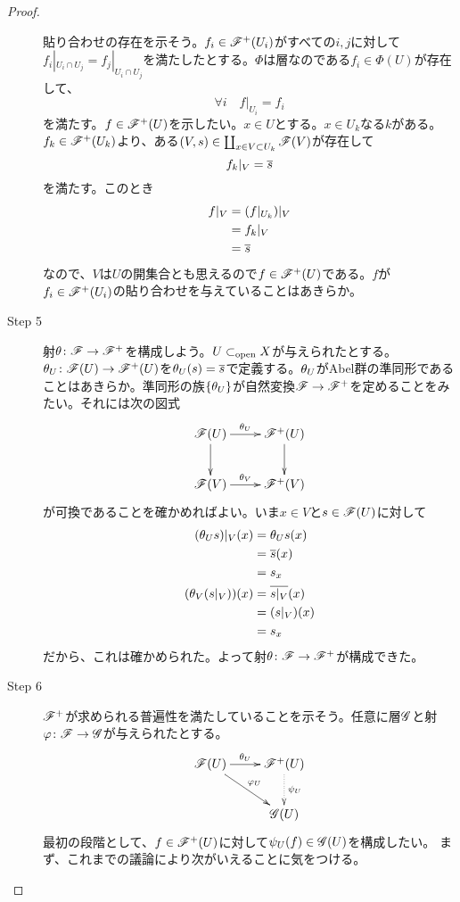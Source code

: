 \begin{proof}
\begin{description}
貼り合わせの存在を示そう。$f_i \in \mathscr{F}^+(U_i)$がすべての$i,j$に対して$f_i |_{U_i \cap U_j} = f_j |_{U_i \cap U_j}$を満たしたとする。$\Phi$は層なのである$f_i \in \Phi(U)$が存在して、
\[
\forall i \quad f|_{U_i} = f_i
\]
を満たす。$f \in \mathscr{F}^+(U)$を示したい。$x \in U$とする。$x \in U_k$なる$k$がある。$f_k \in \mathscr{F}^+(U_k)$より、ある$(V,s) \in \coprod_{x \in V \subset U_k} \mathscr{F}(V)$が存在して
\[
f_k |_V = \overline{s}
\]
を満たす。このとき
\begin{align*}
  f|_V &= (f|_{U_k})|_V \\
  &= f_k |_V \\
  &= \overline{s}
\end{align*}
なので、$V$は$U$の開集合とも思えるので$f \in \mathscr{F}^+(U)$である。$f$が$f_i \in \mathscr{F}^+(U_i)$の貼り合わせを与えていることはあきらか。

\item[Step 5] 射${\theta} \colon \mathscr{F} \to \mathscr{F}^+$を構成しよう。$U \subset_{\text{open}} X$が与えられたとする。${\theta}_U \colon \mathscr{F}(U) \to \mathscr{F}^+(U) $を${\theta}_U (s) = \overline{s}$で定義する。${\theta}_U$がAbel群の準同形であることはあきらか。準同形の族$\{ {\theta}_U \}$が自然変換$\mathscr{F} \to \mathscr{F}^+$を定めることをみたい。それには次の図式
\[
\xymatrix{
\scrf(U) \ar[r]^-{\grt_U} \ar[d] & \scrf^+(U) \ar[d] \\
\scrf(V) \ar[r]^-{\grt_V} & \scrf^+(V)
}
\]
が可換であることを確かめればよい。いま$x \in V$と$s \in \mathscr{F}(U)$に対して
\begin{align*}
  ({\theta}_U s)|_V (x) &= {\theta}_U s (x) \\
  &= \overline{s}(x) \\
  &= s_x \\
  ({\theta}_V (s|_V))(x) &= \overline{s|_V}(x) \\
  &= (s|_V)(x) \\
  &= s_x
\end{align*}
だから、これは確かめられた。よって射${\theta} \colon \mathscr{F} \to \mathscr{F}^+$が構成できた。
\item[Step 6] $\mathscr{F}^+$が求められる普遍性を満たしていることを示そう。任意に層$\mathscr{G}$と射${\varphi} \colon \mathscr{F} \to \mathscr{G}$が与えられたとする。
\[
\xymatrix{
\scrf(U) \ar[r]^-{\grt_U} \ar[rd]^-{\vp_U} & \scrf^+(U) \ar@{.>}[d]^-{\psi_U} \\
{} & \scrg(U)
}
\]
最初の段階として、$f \in \mathscr{F}^+(U)$に対して$\psi_U(f) \in \mathscr{G}(U)$を構成したい。
まず、これまでの議論により次がいえることに気をつける。
\end{description}
\end{proof}
